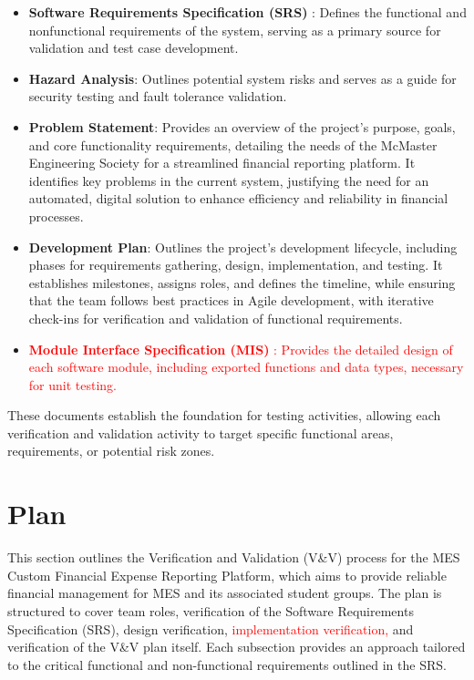 \documentclass[12pt, titlepage]{article}
\begin{document}
\begin{itemize}
    \item \textbf{Software Requirements Specification (SRS)} \citep{SRS}: Defines the functional and nonfunctional requirements of the system, serving as a primary source for validation and test case development.
    \item \textbf{Hazard Analysis}\citep{HazardAnalysis}: Outlines potential system risks and serves as a guide for security testing and fault tolerance validation.
    \item \textbf{Problem Statement}\citep{ProblemStatement}: Provides an overview of the project's purpose, goals, and core functionality requirements, detailing the needs of the McMaster Engineering Society for a streamlined financial reporting platform. It identifies key problems in the current system, justifying the need for an automated, digital solution to enhance efficiency and reliability in financial processes.
    \item \textbf{Development Plan}\citep{DevelopmentPlan}: Outlines the project's development lifecycle, including phases for requirements gathering, design, implementation, and testing. It establishes milestones, assigns roles, and defines the timeline, while ensuring that the team follows best practices in Agile development, with iterative check-ins for verification and validation of functional requirements.
    \item \textcolor{red}{\textbf{Module Interface Specification (MIS)} \citep{MIS}: Provides the detailed design of each software module, including exported functions and data types, necessary for unit testing.}
\end{itemize}

These documents establish the foundation for testing activities, allowing each verification and validation activity to target specific functional areas, requirements, or potential risk zones.

\section{Plan}
This section outlines the Verification and Validation (V\&V) process for the MES Custom Financial Expense Reporting Platform, which aims to provide reliable financial management for MES and its associated student groups. The plan is structured to cover team roles, verification of the Software Requirements Specification (SRS), design verification, \textcolor{red}{implementation verification,} and verification of the V\&V plan itself. Each subsection provides an approach tailored to the critical functional and non-functional requirements outlined in the SRS.
\end{document}
